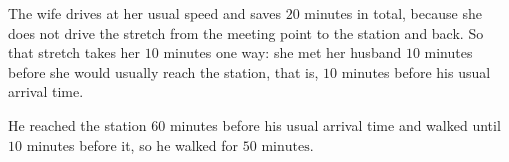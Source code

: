 The wife drives at her usual speed and saves $20$ minutes in total, because she does not drive the stretch from the meeting point to the station and back. So that stretch takes her $10$ minutes one way: she met her husband $10$ minutes before she would usually reach the station, that is, $10$ minutes before his usual arrival time.

He reached the station $60$ minutes before his usual arrival time and walked until $10$ minutes before it, so he walked for $\boxed{50\text{ minutes}}$.
